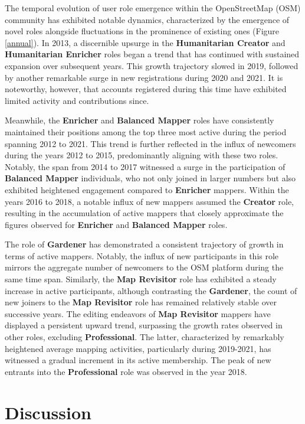 \documentclass[manuscript,screen,review]{acmart}
\begin{document}
The temporal evolution of user role emergence within the OpenStreetMap (OSM) community has exhibited notable dynamics, characterized by the emergence of novel roles alongside fluctuations in the prominence of existing ones (Figure \ref{annual}). In 2013, a discernible upsurge in the \textbf{Humanitarian Creator} and \textbf{Humanitarian Enricher} roles began a trend that has continued with sustained expansion over subsequent years. This growth trajectory slowed in 2019, followed by another remarkable surge in new registrations during 2020 and 2021. It is noteworthy, however, that accounts registered during this time have exhibited limited activity and contributions since.

Meanwhile, the \textbf{Enricher} and \textbf{Balanced Mapper} roles have consistently maintained their positions among the top three most active during the period spanning 2012 to 2021. This trend is further reflected in the influx of newcomers during the years 2012 to 2015, predominantly aligning with these two roles. Notably, the span from 2014 to 2017 witnessed a surge in the participation of \textbf{Balanced Mapper} individuals, who not only joined in larger numbers but also exhibited heightened engagement compared to \textbf{Enricher} mappers. Within the years 2016 to 2018, a notable influx of new mappers assumed the \textbf{Creator} role, resulting in the accumulation of active mappers that closely approximate the figures observed for \textbf{Enricher} and \textbf{Balanced Mapper} roles.

The role of \textbf{Gardener} has demonstrated a consistent trajectory of growth in terms of active mappers. Notably, the influx of new participants in this role mirrors the aggregate number of newcomers to the OSM platform during the same time span. Similarly, the \textbf{Map Revisitor} role has exhibited a steady increase in active participants, although contrasting the \textbf{Gardener}, the count of new joiners to the \textbf{Map Revisitor} role has remained relatively stable over successive years. The editing endeavors of \textbf{Map Revisitor} mappers have displayed a persistent upward trend, surpassing the growth rates observed in other roles, excluding \textbf{Professional}. The latter, characterized by remarkably heightened average mapping activities, particularly during 2019-2021, has witnessed a gradual increment in its active membership. The peak of new entrants into the \textbf{Professional} role was observed in the year 2018.

\section{Discussion}
\end{document}
